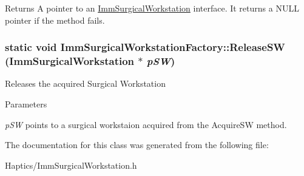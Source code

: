 \begin{DoxyReturn}{Returns}
A pointer to an \hyperlink{classImmSurgicalWorkstation}{ImmSurgicalWorkstation} interface. It returns a NULL pointer if the method fails. 
\end{DoxyReturn}
\hypertarget{classImmSurgicalWorkstationFactory_aea3cddc144fe3f15f5518f6f9f234209}{
\subsubsection[{ReleaseSW}]{\setlength{\rightskip}{0pt plus 5cm}static void ImmSurgicalWorkstationFactory::ReleaseSW ({\bf ImmSurgicalWorkstation} $\ast$ {\em pSW})}}
\label{classImmSurgicalWorkstationFactory_aea3cddc144fe3f15f5518f6f9f234209}
Releases the acquired Surgical Workstation


\begin{DoxyParams}{Parameters}
\item[{\em pSW}]points to a surgical workstaion acquired from the AcquireSW method. \end{DoxyParams}


The documentation for this class was generated from the following file:\begin{DoxyCompactItemize}
\item 
Haptics/ImmSurgicalWorkstation.h\end{DoxyCompactItemize}
